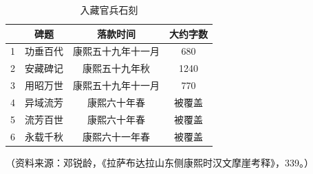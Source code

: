 \begin{table}[htbp]
\centering\small
\setlength{\parskip}{0pt}
\caption{入藏官兵石刻}\label{tab:tibet-inscriptions}
\renewcommand{\arraystretch}{1.5}
\begin{tabular}{|c|c|c|c|}
\hline
 & 碑题 & 落款时间 & 大约字数 \\
\hline
1 & 功垂百代 & 康熙五十九年十一月 & 680 \\
\hline
2 & 安藏碑记 & 康熙五十九年秋 & 1240 \\
\hline
3 & 用昭万世 & 康熙五十九年十一月 & 770 \\
\hline
4 & 异域流芳 & 康熙六十年春 & 被覆盖 \\
\hline
5 & 流芳百世 & 康熙六十年春 & 被覆盖 \\
\hline
6 & 永载千秋 & 康熙六十一年春 & 被覆盖 \\
\hline
\end{tabular}
\par\nointerlineskip\vspace{3pt}
\begin{minipage}{\linewidth}\small
（资料来源：邓锐龄，《拉萨布达拉山东侧康熙时汉文摩崖考释》，339。）
\end{minipage}
\end{table}
